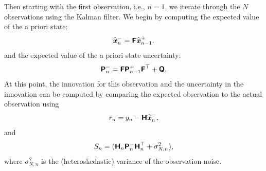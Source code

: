 \documentclass[a4paper,fleqn,usenatbib]{mnras}
\begin{document}
Then starting with the first observation, i.e., $n = 1$, we iterate through the $N$ observations using the Kalman filter. We begin by computing the expected value of the a priori state:
\begin{equation}\label{eq:APrioriState}
\widehat{\textbf{\textit{x}}}^{-}_{n} = \textbf{\textsf{F}} \widehat{\textbf{\textit{x}}}^{+}_{n-1}.
\end{equation}
and the expected value of the a priori state uncertainty:
\begin{equation}\label{eq:APrioriUncertainty}
\textbf{\textsf{P}}^{-}_{n} = \textbf{\textsf{F}} \textbf{\textsf{P}}^{+}_{n-1} \textbf{\textsf{F}}^{\top} + \textbf{\textsf{Q}}.
\end{equation}
At this point, the innovation for this observation and the uncertainty in the innovation can be computed by comparing the expected observation to the actual observation using
\begin{equation}\label{eq:Innovation}
r_{n} = y_{n} - \textbf{\textsf{H}}\widehat{\textbf{\textit{x}}}^{-}_{n},
\end{equation}
and
\begin{equation}\label{eq:InnovationVar}
S_{n} = ( \textbf{\textsf{H}}_{n} \textbf{\textsf{P}}^{-}_{n} \textbf{\textsf{H}}_{n}^{\top} + \sigma^{2}_{N,n}),
\end{equation}
where $\sigma^{2}_{N,n}$ is the (heteroskedastic) variance of the observation noise.
\end{document}
